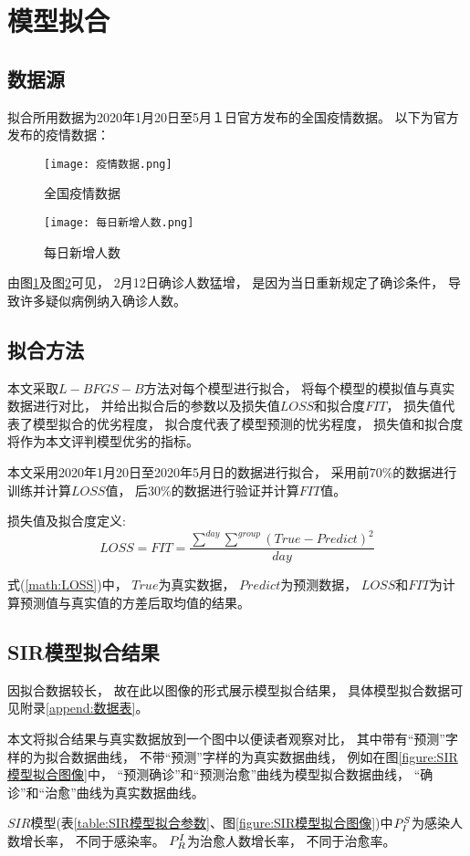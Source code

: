 \section{模型拟合}
\subsection{数据源}
\par 拟合所用数据为2020年1月20日至5月１日官方发布的全国疫情数据。
以下为官方发布的疫情数据：
\begin{figure}[H]
    \centering
    \texttt{[image: 疫情数据.png]}
    \caption{全国疫情数据\label{figure:全国疫情数据}}
\end{figure}
\begin{figure}[H]
    \centering
    \texttt{[image: 每日新增人数.png]}
    \caption{每日新增人数\label{figure:每日新增人数}}
\end{figure}
\par
由图\ref{figure:全国疫情数据}及图\ref{figure:每日新增人数}可见，
2月12日确诊人数猛增，
是因为当日重新规定了确诊条件，
导致许多疑似病例纳入确诊人数。
\subsection{拟合方法}
\par 本文采取$L-BFGS-B$方法对每个模型进行拟合，
将每个模型的模拟值与真实数据进行对比，
并给出拟合后的参数以及损失值$LOSS$和拟合度$FIT$，
损失值代表了模型拟合的优劣程度，
拟合度代表了模型预测的忧劣程度，
损失值和拟合度将作为本文评判模型优劣的指标。
\par 本文采用2020年1月20日至2020年5月日的数据进行拟合，
采用前$70\%$的数据进行训练并计算$LOSS$值，
后$30\%$的数据进行验证并计算$FIT$值。
\par 损失值及拟合度定义:
\begin{equation}
    LOSS= FIT = \frac{\sum\limits^{day}\sum\limits^{group}
        (True-Predict)^2}{day}
    \label{math:LOSS}
\end{equation}
\par 式(\ref{math:LOSS})中，
$True$为真实数据，
$Predict$为预测数据，
$LOSS$和$FIT$为计算预测值与真实值的方差后取均值的结果。
\subsection{SIR模型拟合结果}
\par 因拟合数据较长，
故在此以图像的形式展示模型拟合结果，
具体模型拟合数据可见附录\ref{append:数据表}。
\par 本文将拟合结果与真实数据放到一个图中以便读者观察对比，
其中带有“预测”字样的为拟合数据曲线，
不带“预测”字样的为真实数据曲线，
例如在图\ref{figure:SIR模型拟合图像}中，
“预测确诊”和“预测治愈”曲线为模型拟合数据曲线，
“确诊”和“治愈”曲线为真实数据曲线。
\par $SIR$模型(表\ref{table:SIR模型拟合参数}、图\ref{figure:SIR模型拟合图像})中$\P{S}{I}$为感染人数增长率，
不同于感染率。
$\P{I}{R}$为治愈人数增长率，
不同于治愈率。
